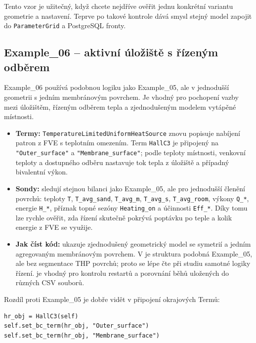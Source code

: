 \documentclass[a4paper,11pt]{article}
\begin{document}
Tento vzor je užitečný, když chcete nejdříve ověřit jednu konkrétní variantu
geometrie a nastavení. Teprve po takové kontrole dává smysl stejný model zapojit
do \texttt{ParameterGrid} a PostgreSQL fronty.

\subsection*{Example\_06 -- aktivní úložiště s řízeným odběrem}

Example\_06 používá podobnou logiku jako Example\_05, ale v jednodušší geometrii
s jedním membránovým povrchem. Je vhodný pro pochopení vazby mezi úložištěm,
řízeným odběrem tepla a zjednodušeným modelem vytápěné místnosti.

\begin{itemize}
  \item \textbf{Termy:} \texttt{TemperatureLimitedUniformHeatSource} znovu
        popisuje nabíjení patron z FVE s teplotním omezením. Term
        \texttt{HallC3} je připojený na \texttt{"Outer\_surface"} a
        \texttt{"Membrane\_surface"}; podle teploty místnosti, venkovní teploty
        a dostupného odběru nastavuje tok tepla z úložiště a případný bivalentní
        výkon.
  \item \textbf{Sondy:} sledují stejnou bilanci jako Example\_05, ale pro
        jednodušší členění povrchů: teploty \texttt{T}, \texttt{T\_avg\_sand},
        \texttt{T\_avg\_m}, \texttt{T\_avg\_s}, \texttt{T\_avg\_room}, výkony
        \texttt{Q\_*}, energie \texttt{H\_*}, příznak topné sezóny
        \texttt{Heating\_on} a účinnosti \texttt{Eff\_*}. Díky tomu lze rychle
        ověřit, zda řízení skutečně pokrývá poptávku po teple a kolik energie
        z FVE se využije.
  \item \textbf{Jak číst kód:}  ukazuje zjednodušený
        geometrický model se symetrií a jedním agregovaným membránovým povrchem.
        V  je struktura podobná Example\_05, ale bez segmentace
        THP povrchů; proto se lépe čte při studiu samotné logiky řízení.
         je vhodný pro kontrolu restartů a porovnání běhů
        uložených do různých CSV souborů.
\end{itemize}

Rozdíl proti Example\_05 je dobře vidět v připojení okrajových Termů:

\begin{lstlisting}[style=py]
hr_obj = HallC3(self)
self.set_bc_term(hr_obj, "Outer_surface")
self.set_bc_term(hr_obj, "Membrane_surface")
\end{lstlisting}
\end{document}
